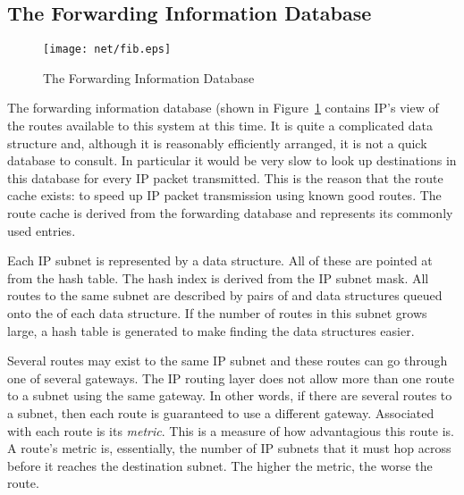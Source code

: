 \subsection{The Forwarding Information Database}
\begin{figure}
\begin{center}
{\centering \texttt{[image: net/fib.eps]} \par}
\end{center}
\caption{The Forwarding Information Database}
\label{fib-figure}
\end{figure}
The forwarding information database (shown in Figure~\ref{fib-figure} contains IP's view of the routes available
to this system at this time.
It is quite a complicated data structure and, although it is reasonably efficiently arranged, it is not a
quick database to consult.
In particular it would be very slow to look up destinations in this database for every IP packet
transmitted.
This is the reason that the route cache exists: to speed up IP packet transmission using known good
routes.
The route cache is derived from the forwarding database and represents its commonly used entries.

Each IP subnet is represented by a  data structure.
All of these are pointed at from the  hash table.
The hash index is derived from the IP subnet mask.
All routes to the same subnet are described by pairs of  and  data structures
queued onto the   of each  data structure.
If the number of routes in this subnet grows large, a hash table is generated to make finding the 
data structures easier.

Several routes may exist to the same IP subnet and these routes can go through one of several gateways.
The IP routing layer does not allow more than one route to a subnet using the same gateway.
In other words, if there are several routes to a subnet, then each route is guaranteed to use a different
gateway.
Associated with each route is its {\em metric}.
This is a measure of how advantagious this route is.
A route's metric is, essentially, the number of IP subnets that it must hop across before it reaches
the destination subnet.
The higher the metric, the worse the route.



